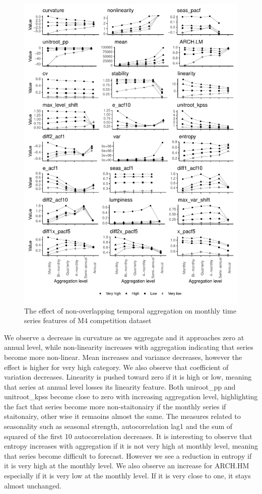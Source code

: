 \documentclass[]{elsarticle} %
\begin{document}
\begin{figure}[H]

{\centering \includegraphics[width=0.7\linewidth]{img/mp_category_all1} 

}

\caption{The effect of non-overlapping temporal aggregation on monthly time series features of M4 competition dataset}\label{fig:featureagg1}
\end{figure}

We observe a decrease in curvature as we aggregate and it approaches
zero at annual level, while non-linearity increases with aggregation
indicating that series become more non-linear. Mean increases and
variance decreases, however the effect is higher for very high category.
We also observe that coefficient of variation decreases. Linearity is
pushed toward zero if it is high or low, meaning that series at annual
level losses its linearity feature. Both uniroot\_pp and unitroot\_kpss
become close to zero with increasing aggregation level, highlighting the
fact that series become more non-staitonairy if the monthly series if
staitonairy, other wise it remaoins almost the same. The measures
related to seasonality such as seasonal strength, autocorrelation lag1
and the sum of squared of the first 10 autocorrelation decreases. It is
interesting to observe that entropy increases with aggregation if it is
not very high at monthly level, meaning that series become difficult to
forecast. However we see a reduction in entropy if it is very high at
the monthly level. We also observe an increase for ARCH.HM especially if
it is very low at the monthly level. If it is very close to one, it
stays almost unchanged.
\end{document}
